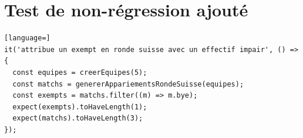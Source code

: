 \section*{Test de non-régression ajouté}
\begin{lstlisting}[language=]
it('attribue un exempt en ronde suisse avec un effectif impair', () => {
  const equipes = creerEquipes(5);
  const matchs = genererAppariementsRondeSuisse(equipes);
  const exempts = matchs.filter((m) => m.bye);
  expect(exempts).toHaveLength(1);
  expect(matchs).toHaveLength(3);
});
\end{lstlisting}


